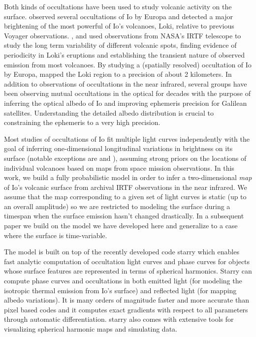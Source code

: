 \documentclass[modern]{aastex62}
\begin{document}
Both kinds of occultations have been used to study volcanic activity on the surface.
\cite{spencer1994} observed several occultations of Io by Europa and detected a major brightening of the most powerful of Io's volcanoes, Loki, relative to previous Voyager observations.
\cite{rathbun2002},\citet{rathbun2006} and \citet{rathbun2010} used observations from NASA's IRTF telescope to study the long term variability of different volcanic spots, finding evidence of periodicity in Loki's eruptions and establishing the transient nature of observed emission from most volcanoes. 
By studying a (spatially resolved) occultation of Io by Europa, \cite{dekleer2017} mapped the Loki region to a precision of about 2 kilometers.
In addition to observations of occultations in the near infrared, several groups have been observing mutual occultations in the optical \citep[][and references therein]{arlot1974,saquet2018,morgado2016a} for decades with the purpose of inferring the optical albedo of Io and improving ephemeris precision for Galilean satellites.
Understanding the detailed albedo distribution is crucial to constraining the ephemeris to a very high precision.

Most studies of occultations of Io fit multiple light curves independently with the goal of inferring one-dimensional longitudinal variations in brightness on its surface (notable exceptions are \cite{spencer1994} and \cite{dekleer2017}), assuming strong priors on the locations of individual volcanoes based on maps from space mission observations.
In this work, we build a fully probabilistic model in order to infer a two-dimensional \emph{map} of Io's volcanic surface from archival IRTF observations in the near infrared.
We assume that the map corresponding to a given set of light curves is static (up to an overall amplitude) so we are restricted to modeling the surface during a timespan when the surface emission hasn't changed drastically.
In a subsequent paper we build on the model we have developed here and generalize to a case where the surface is time-variable.

The model is built on top of the recently developed code \textsf{starry}\citep[][Luger et al. 2021 in prep]{luger2019a} which enables fast analytic computation of occultation light curves and phase curves for objects whose surface features are represented in terms of spherical harmonics.
Starry can compute phase curves and occultations in both emitted light (for modeling the isotropic thermal emission from Io's surface) and reflected light (for mapping albedo variations).
It is many orders of magnitude faster and more accurate than pixel based codes and it computes exact gradients with respect to all parameters through automatic differentiation.
\textsf{starry} also comes with extensive tools for visualizing spherical harmonic maps and simulating data.
\end{document}
